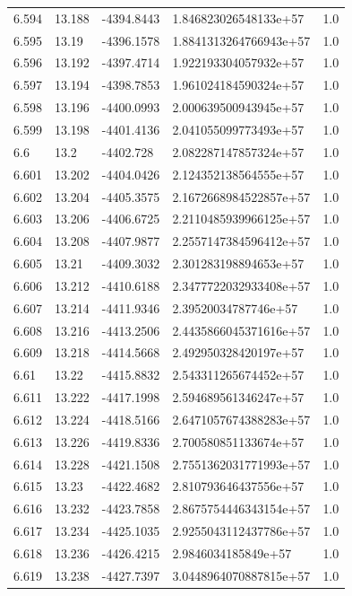 \begin{tabular}{lllll}
6.594 & 13.188 & -4394.8443 & 1.846823026548133e+57 & 1.0 \\
6.595 & 13.19 & -4396.1578 & 1.8841313264766943e+57 & 1.0 \\
6.596 & 13.192 & -4397.4714 & 1.922193304057932e+57 & 1.0 \\
6.597 & 13.194 & -4398.7853 & 1.961024184590324e+57 & 1.0 \\
6.598 & 13.196 & -4400.0993 & 2.000639500943945e+57 & 1.0 \\
6.599 & 13.198 & -4401.4136 & 2.041055099773493e+57 & 1.0 \\
6.6 & 13.2 & -4402.728 & 2.082287147857324e+57 & 1.0 \\
6.601 & 13.202 & -4404.0426 & 2.124352138564555e+57 & 1.0 \\
6.602 & 13.204 & -4405.3575 & 2.1672668984522857e+57 & 1.0 \\
6.603 & 13.206 & -4406.6725 & 2.2110485939966125e+57 & 1.0 \\
6.604 & 13.208 & -4407.9877 & 2.2557147384596412e+57 & 1.0 \\
6.605 & 13.21 & -4409.3032 & 2.301283198894653e+57 & 1.0 \\
6.606 & 13.212 & -4410.6188 & 2.3477722032933408e+57 & 1.0 \\
6.607 & 13.214 & -4411.9346 & 2.39520034787746e+57 & 1.0 \\
6.608 & 13.216 & -4413.2506 & 2.4435866045371616e+57 & 1.0 \\
6.609 & 13.218 & -4414.5668 & 2.492950328420197e+57 & 1.0 \\
6.61 & 13.22 & -4415.8832 & 2.543311265674452e+57 & 1.0 \\
6.611 & 13.222 & -4417.1998 & 2.594689561346247e+57 & 1.0 \\
6.612 & 13.224 & -4418.5166 & 2.6471057674388283e+57 & 1.0 \\
6.613 & 13.226 & -4419.8336 & 2.700580851133674e+57 & 1.0 \\
6.614 & 13.228 & -4421.1508 & 2.7551362031771993e+57 & 1.0 \\
6.615 & 13.23 & -4422.4682 & 2.810793646437556e+57 & 1.0 \\
6.616 & 13.232 & -4423.7858 & 2.8675754446343154e+57 & 1.0 \\
6.617 & 13.234 & -4425.1035 & 2.9255043112437786e+57 & 1.0 \\
6.618 & 13.236 & -4426.4215 & 2.9846034185849e+57 & 1.0 \\
6.619 & 13.238 & -4427.7397 & 3.0448964070887815e+57 & 1.0 \\

\end{tabular}
